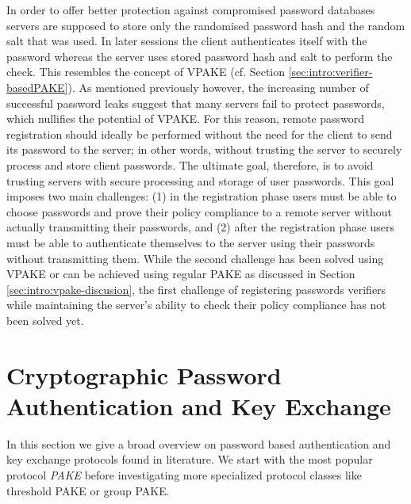 In order to offer better protection against compromised password databases servers are supposed to store only the randomised password hash and the random salt that was used.
In later sessions the client authenticates itself with the password whereas the server uses stored password hash and salt to perform the check.
This resembles the concept of \ac{VPAKE} (cf. Section \ref{sec:intro:verifier-basedPAKE}).
As mentioned previously however, the increasing number of successful password leaks suggest that many servers fail to protect passwords, which nullifies the potential of \ac{VPAKE}.
For this reason, remote password registration should ideally be performed without the need for the client to send its password to the server; in other words, without trusting the server to securely process and store client passwords.
The ultimate goal, therefore, is to avoid trusting servers with secure processing and storage of user passwords.
This goal imposes two main challenges:
(1) in the registration phase users must be able to choose passwords and prove their policy compliance to a remote server without actually transmitting their passwords, and 
(2) after the registration phase users must be able to authenticate themselves to the server using their passwords without transmitting them.
While the second challenge has been solved using \ac{VPAKE} or can be achieved using regular \ac{PAKE} as discussed in Section \ref{sec:intro:vpake-discusion}, the first challenge of registering passwords verifiers while maintaining the server's ability to check their policy compliance has not been solved yet.




\section{Cryptographic Password Authentication and Key Exchange}
In this section we give a broad overview on password based authentication and key exchange protocols found in literature.
We start with the most popular protocol \emph{\ac{PAKE}} before investigating more specialized protocol classes like threshold \ac{PAKE} or group \ac{PAKE}.

